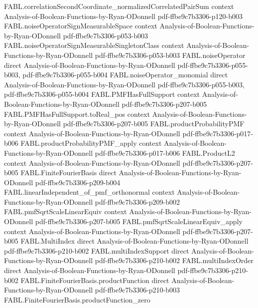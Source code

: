 \begin{theorem}
  {FABL.correlationSecondCoordinate_normalizedCorrelatedPairSum}
  {context}
  {Analysis-of-Boolean-Functions-by-Ryan-ODonnell}
  {pdf-ffbe9c7b3306-p120-b003}
\proofstep
  {FABL.noiseOperatorSignMeasurableSpace}
  {context}
  {Analysis-of-Boolean-Functions-by-Ryan-ODonnell}
  {pdf-ffbe9c7b3306-p053-b003}
\proofstep
  {FABL.noiseOperatorSignMeasurableSingletonClass}
  {context}
  {Analysis-of-Boolean-Functions-by-Ryan-ODonnell}
  {pdf-ffbe9c7b3306-p053-b003}
\proofstep
  {FABL.noiseOperator}
  {direct}
  {Analysis-of-Boolean-Functions-by-Ryan-ODonnell}
  {pdf-ffbe9c7b3306-p055-b003,
    pdf-ffbe9c7b3306-p055-b004}
\proofstep
  {FABL.noiseOperator_monomial}
  {direct}
  {Analysis-of-Boolean-Functions-by-Ryan-ODonnell}
  {pdf-ffbe9c7b3306-p055-b003,
    pdf-ffbe9c7b3306-p055-b004}
\proofstep
  {FABL.PMFHasFullSupport}
  {context}
  {Analysis-of-Boolean-Functions-by-Ryan-ODonnell}
  {pdf-ffbe9c7b3306-p207-b005}
\proofstep
  {FABL.PMFHasFullSupport.toReal_pos}
  {context}
  {Analysis-of-Boolean-Functions-by-Ryan-ODonnell}
  {pdf-ffbe9c7b3306-p207-b005}
\proofstep
  {FABL.productProbabilityPMF}
  {context}
  {Analysis-of-Boolean-Functions-by-Ryan-ODonnell}
  {pdf-ffbe9c7b3306-p017-b006}
\proofstep
  {FABL.productProbabilityPMF_apply}
  {context}
  {Analysis-of-Boolean-Functions-by-Ryan-ODonnell}
  {pdf-ffbe9c7b3306-p017-b006}
\proofstep
  {FABL.ProductL2}
  {context}
  {Analysis-of-Boolean-Functions-by-Ryan-ODonnell}
  {pdf-ffbe9c7b3306-p207-b005}
\proofstep
  {FABL.FiniteFourierBasis}
  {direct}
  {Analysis-of-Boolean-Functions-by-Ryan-ODonnell}
  {pdf-ffbe9c7b3306-p209-b004}
\proofstep
  {FABL.linearIndependent_of_pmf_orthonormal}
  {context}
  {Analysis-of-Boolean-Functions-by-Ryan-ODonnell}
  {pdf-ffbe9c7b3306-p209-b002}
\proofstep
  {FABL.pmfSqrtScaleLinearEquiv}
  {context}
  {Analysis-of-Boolean-Functions-by-Ryan-ODonnell}
  {pdf-ffbe9c7b3306-p207-b005}
\proofstep
  {FABL.pmfSqrtScaleLinearEquiv_apply}
  {context}
  {Analysis-of-Boolean-Functions-by-Ryan-ODonnell}
  {pdf-ffbe9c7b3306-p207-b005}
\proofstep
  {FABL.MultiIndex}
  {direct}
  {Analysis-of-Boolean-Functions-by-Ryan-ODonnell}
  {pdf-ffbe9c7b3306-p210-b002}
\proofstep
  {FABL.multiIndexSupport}
  {direct}
  {Analysis-of-Boolean-Functions-by-Ryan-ODonnell}
  {pdf-ffbe9c7b3306-p210-b002}
\proofstep
  {FABL.multiIndexOrder}
  {direct}
  {Analysis-of-Boolean-Functions-by-Ryan-ODonnell}
  {pdf-ffbe9c7b3306-p210-b002}
\proofstep
  {FABL.FiniteFourierBasis.productFunction}
  {direct}
  {Analysis-of-Boolean-Functions-by-Ryan-ODonnell}
  {pdf-ffbe9c7b3306-p210-b003}
\proofstep
  {FABL.FiniteFourierBasis.productFunction_zero}

\end{theorem}
